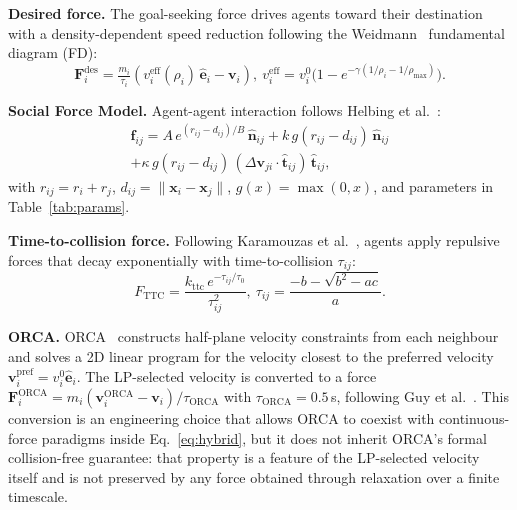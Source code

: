 \documentclass[a4paper,twoside]{article}
\begin{document}
\textbf{Desired force.}
The goal-seeking force drives agents toward their destination with a density-dependent speed reduction following the Weidmann~\cite{Weidmann93} fundamental diagram (FD):
\begin{equation}\label{eq:desired}
    \mathbf{F}_i^{\text{des}} = \tfrac{m_i}{\tau_i}\!\left(v_i^{\text{eff}}(\rho_i)\,\hat{\mathbf{e}}_i - \mathbf{v}_i\right),\ v_i^{\text{eff}} = v_i^0\bigl(1 - e^{-\gamma(1/\rho_i - 1/\rho_{\max})}\bigr).
\end{equation}

\textbf{Social Force Model.}
Agent-agent interaction follows Helbing et al.~\cite{Helbing00}:
\begin{multline}\label{eq:sfm}
    \mathbf{f}_{ij} = A\,e^{(r_{ij} - d_{ij})/B}\,\hat{\mathbf{n}}_{ij} + k\,g(r_{ij} - d_{ij})\,\hat{\mathbf{n}}_{ij} \\
    + \kappa\,g(r_{ij} - d_{ij})\,(\Delta\mathbf{v}_{ji}{\cdot}\hat{\mathbf{t}}_{ij})\,\hat{\mathbf{t}}_{ij},
\end{multline}
with $r_{ij}=r_i+r_j$, $d_{ij}=\|\mathbf{x}_i-\mathbf{x}_j\|$, $g(x)=\max(0,x)$, and parameters in Table~\ref{tab:params}.

\textbf{Time-to-collision force.}
Following Karamouzas et al.~\cite{Karamouzas14}, agents apply repulsive forces that decay exponentially with time-to-collision $\tau_{ij}$:
\begin{equation}\label{eq:ttc}
    F_{\text{TTC}} = \frac{k_{\text{ttc}}\,e^{-\tau_{ij}/\tau_0}}{\tau_{ij}^2},\ \tau_{ij} = \frac{-b - \sqrt{b^2-ac}}{a}.
\end{equation}

\textbf{ORCA.}
ORCA~\cite{VandenBerg11} constructs half-plane velocity constraints from each neighbour and solves a 2D linear program for the velocity closest to the preferred velocity $\mathbf{v}_i^{\text{pref}}=v_i^0\hat{\mathbf{e}}_i$. The LP-selected velocity is converted to a force $\mathbf{F}_i^{\text{ORCA}} = m_i(\mathbf{v}_i^{\text{ORCA}}-\mathbf{v}_i)/\tau_{\text{ORCA}}$ with $\tau_{\text{ORCA}}=0.5$\,s, following Guy et al.~\cite{Guy10}. This conversion is an engineering choice that allows ORCA to coexist with continuous-force paradigms inside Eq.~\eqref{eq:hybrid}, but it does not inherit ORCA's formal collision-free guarantee: that property is a feature of the LP-selected velocity itself and is not preserved by any force obtained through relaxation over a finite timescale.
\end{document}
